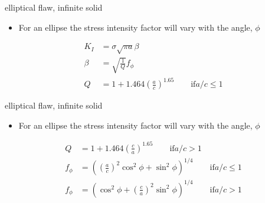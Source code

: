 \documentclass[
  letterpaper,
  ignorenonframetext,
  aspectratio=43,
  handout,
  12pt]{beamer}
\providecommand{\tightlist}{%
  \setlength{\itemsep}{0pt}\setlength{\parskip}{0pt}}
\providecommand{\tightlist}{%
\setlength{\itemsep}{0pt}\setlength{\parskip}{0pt}}
\begin{document}
\begin{frame}{elliptical flaw, infinite solid}
\protect\hypertarget{elliptical-flaw-infinite-solid-1}{}
\begin{itemize}
\tightlist
\item
  For an ellipse the stress intensity factor will vary with the angle,
  \(\phi\)
\end{itemize}

\[\begin{aligned}
  K_I &= \sigma \sqrt{\pi a} \beta\\
  \beta &= \sqrt{\frac{1}{Q}} f_\phi\\
  Q &= 1+ 1.464 \left(\frac{a}{c}\right)^{1.65} \qquad \text{if} a/c \le 1
\end{aligned}\]
\end{frame}

\begin{frame}{elliptical flaw, infinite solid}
\protect\hypertarget{elliptical-flaw-infinite-solid-2}{}
\begin{itemize}
\tightlist
\item
  For an ellipse the stress intensity factor will vary with the angle,
  \(\phi\)
\end{itemize}

\[\begin{aligned}
  Q &= 1+ 1.464 \left(\frac{c}{a}\right)^{1.65} \qquad \text{if} a/c > 1\\
  f_\phi &= \left(\left(\frac{a}{c}\right)^2 \cos^2 \phi + \sin^2 \phi \right)^{1/4}\qquad \text{if} a/c \le 1\\
  f_\phi &= \left(\cos^2 \phi + \left(\frac{c}{a}\right)^2 \sin^2 \phi \right)^{1/4}\qquad \text{if} a/c > 1
\end{aligned}\]
\end{frame}
\end{document}
